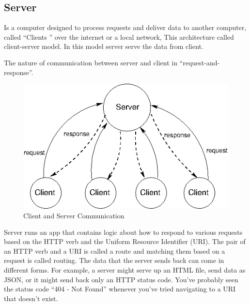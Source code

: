 \subsection{Server}
\hspace{2cm}Is a computer designed to process requests and deliver data to another computer, called “Clients ” over the internet or a local network, This architecture called client-server model. In this model server serve the data from client.

The nature of communication between server and client  in “request-and-response”.
\begin{figure}%
    \center%
    \includegraphics[width=1\textwidth]{images/Software/clientserver.png}%
    \caption[Client and Server Communication]{Client and Server Communication}\label{fig: login}%
  \end{figure}
  
 Server runs an app that contains logic about how to respond to various requests based on the HTTP verb and the Uniform Resource Identifier (URI). The pair of an HTTP verb and a URI is called a route and matching them based on a request is called routing.
The data that the server sends back can come in different forms. For example, a server might serve up an HTML file, send data as JSON, or it might send back only an HTTP status code. You’ve probably seen the status code “404 - Not Found” whenever you’ve tried navigating to a URI that doesn’t exist.

